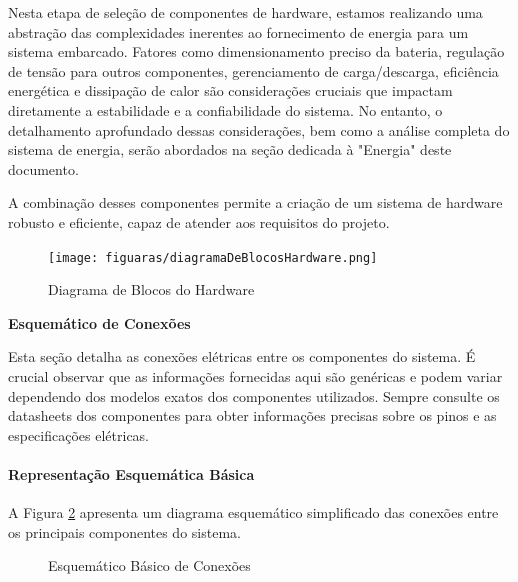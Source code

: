 Nesta etapa de seleção de componentes de hardware, estamos realizando uma abstração das complexidades inerentes ao fornecimento de energia para um sistema embarcado. Fatores como dimensionamento preciso da bateria, regulação de tensão para outros componentes, gerenciamento de carga/descarga, eficiência energética e dissipação de calor são considerações cruciais que impactam diretamente a estabilidade e a confiabilidade do sistema. No entanto, o detalhamento aprofundado dessas considerações, bem como a análise completa do sistema de energia, serão abordados na seção dedicada à "Energia" deste documento.

A combinação desses componentes permite a criação de um sistema de hardware robusto e eficiente, capaz de atender aos requisitos do projeto.

\begin{figure}[h!]
    \centering
    \texttt{[image: figuaras/diagramaDeBlocosHardware.png]}

    \caption{Diagrama de Blocos do Hardware}
    \label{fig_diagrama_blocos_hardware}
\end{figure}

\textbf{Esquemático de Conexões}

Esta seção detalha as conexões elétricas entre os componentes do sistema. É crucial observar que as informações fornecidas aqui são genéricas e podem variar dependendo dos modelos exatos dos componentes utilizados. Sempre consulte os datasheets dos componentes para obter informações precisas sobre os pinos e as especificações elétricas.

\paragraph{Representação Esquemática Básica}

A Figura \ref{fig:esquematico_basico} apresenta um diagrama esquemático simplificado das conexões entre os principais componentes do sistema.

\begin{figure}[h!]
    \centering
    \caption{Esquemático Básico de Conexões}
    \label{fig:esquematico_basico}
\end{figure}

